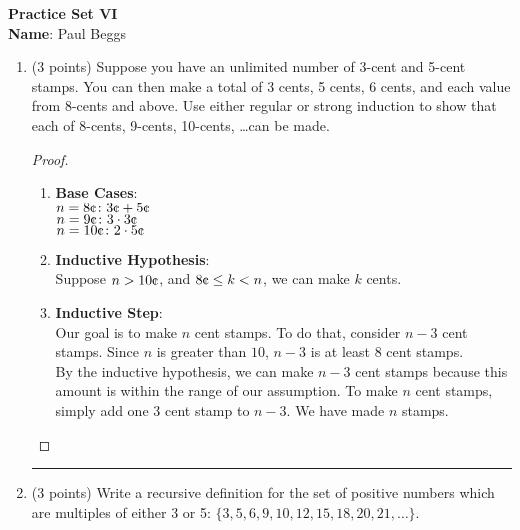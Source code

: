 \documentclass{article}
\def \proofDistance {5pt}
\newcommand{\proofseparator}{\par\noindent\rule{\textwidth}{0.4pt}}
\newcommand{\pf}[1]{
    \vspace{\proofDistance}
    \begin{proof}
    #1
    \end{proof}
    \proofseparator
}
\begin{document}
\begin{center}
    \textbf{Practice Set VI} \\
    
    \textbf{Name}: Paul Beggs \\
\end{center}

\begin{enumerate}
    \item (3 points) Suppose you have an unlimited number of 3-cent and 5-cent stamps. You can then make a total of 3 cents, 5 cents, 6 cents, and each value from 8-cents and above. Use either regular or strong induction to show that each of 8-cents, 9-cents, 10-cents, \dots can be made. 
    \pf{\hfill
        \begin{enumerate}
            \item \textbf{Base Cases}: \\
            $n = 8\text{\textcent}\colon 3\text{\textcent} + 5\text{\textcent}$ \\
            $n = 9\text{\textcent}\colon 3 \cdot 3\text{\textcent}$ \\
            $n = 10\text{\textcent}\colon 2 \cdot 5\text{\textcent}$ \\
    
            \item \textbf{Inductive Hypothesis}: \\
            Suppose $n > 10\text{\textcent}$, and $8\text{\textcent} \leq k < n$, we can make $k$ cents. \\
    
            \item \textbf{Inductive Step}: \\
            Our goal is to make $n$ cent stamps. To do that, consider $n - 3$ cent stamps. Since $n$ is greater than $10$, $n - 3$ is at least $8$ cent stamps. \\
    
            By the inductive hypothesis, we can make $n - 3$ cent stamps because this amount is within the range of our assumption. To make $n$ cent stamps, simply add one $3$ cent stamp to $n - 3$. We have made $n$ stamps.
        \end{enumerate}
    }

\vspace*{\fill}

    \item (3 points) Write a recursive definition for the set of positive numbers which are multiples of either 3 or 5: $\{3,5,6,9, 10, 12, 15, 18, 20, 21,\dots \}$. \\
    

\end{enumerate}
\end{document}

